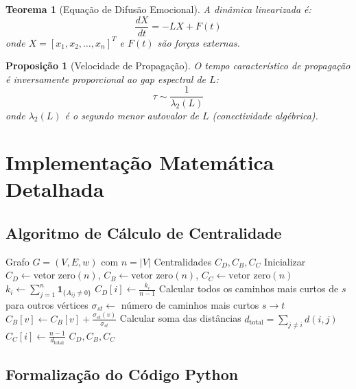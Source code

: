 \documentclass[12pt, a4paper]{article}
\newtheorem{theorem}{Teorema}
\newtheorem{proposition}{Proposição}
\begin{document}
\begin{theorem}[Equação de Difusão Emocional]
A dinâmica linearizada é:
\[
\frac{dX}{dt} = -L X + F(t)
\]
onde $X = [x_1, x_2, \dots, x_n]^T$ e $F(t)$ são forças externas.
\end{theorem}

\begin{proposition}[Velocidade de Propagação]
O tempo característico de propagação é inversamente proporcional ao gap espectral de $L$:
\[
\tau \sim \frac{1}{\lambda_2(L)}
\]
onde $\lambda_2(L)$ é o segundo menor autovalor de $L$ (conectividade algébrica).
\end{proposition}

\section{Implementação Matemática Detalhada}

\subsection{Algoritmo de Cálculo de Centralidade}

\begin{algorithm}[H]
\caption{Cálculo de Centralidades - Versão Matemática}
\begin{algorithmic}[1]
\Require Grafo $G = (V, E, w)$ com $n = |V|$
\Ensure Centralidades $C_D, C_B, C_C$
\State Inicializar $C_D \gets \text{vetor zero}(n)$, $C_B \gets \text{vetor zero}(n)$, $C_C \gets \text{vetor zero}(n)$
    \State $k_i \gets \sum_{j=1}^n \mathbf{1}_{\{A_{ij} \neq 0\}}$ 
    \State $C_D[i] \gets \frac{k_i}{n-1}$ 
\EndFor
{}
    \State Calcular todos os caminhos mais curtos de $s$ para outros vértices
            \State $\sigma_{st} \gets$ número de caminhos mais curtos $s \to t$
                \State $C_B[v] \gets C_B[v] + \frac{\sigma_{st}(v)}{\sigma_{st}}$
            \EndFor
        \EndIf
    \EndFor
\EndFor
{}
    \State Calcular soma das distâncias $d_{\text{total}} = \sum_{j \neq i} d(i,j)$
    \State $C_C[i] \gets \frac{n-1}{d_{\text{total}}}$
\EndFor
\State \Return $C_D, C_B, C_C$
\end{algorithmic}
\end{algorithm}

\subsection{Formalização do Código Python}
\end{document}
